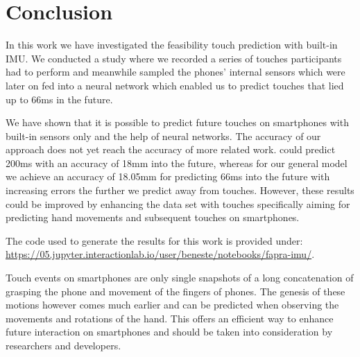 \section{Conclusion}
In this work we have investigated the feasibility touch prediction with built-in IMU. 
We conducted a study where we recorded a series of touches participants had to perform and meanwhile sampled the phones' internal sensors which were later on fed into a neural network which enabled us to predict touches that lied up to 66ms in the future.

We have shown that it is possible to predict future touches on smartphones with built-in sensors only and the help of neural networks.
The accuracy of our approach does not yet reach the accuracy of more related work. 
\citeauthor{MohdNoor2016} \cite{MohdNoor2016} could predict 200ms with an accuracy of 18mm into the future, whereas for our general model we achieve an accuracy of 18.05mm for predicting 66ms into the future with increasing errors the further we predict away from touches.
However, these results could be improved by enhancing the data set with touches specifically aiming for predicting hand movements and subsequent touches on smartphones.

\begin{sidebar}
	The code used to generate the results for this work is provided under: \url{https://05.jupyter.interactionlab.io/user/beneste/notebooks/fapra-imu/}.
\end{sidebar}

Touch events on smartphones are only single snapshots of a long concatenation of grasping the phone and movement of the fingers of phones. 
The genesis of these motions however comes much earlier and can be predicted when observing the movements and rotations of the hand.
This offers an efficient way to enhance future interaction on smartphones and should be taken into consideration by researchers and developers.
